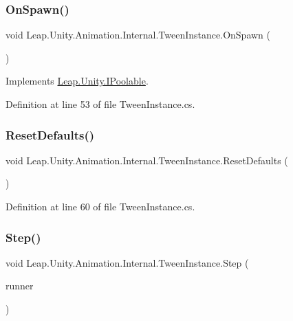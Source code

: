 \subsubsection{\texorpdfstring{OnSpawn()}{OnSpawn()}}
{\footnotesize\ttfamily void Leap.\+Unity.\+Animation.\+Internal.\+Tween\+Instance.\+On\+Spawn (\begin{DoxyParamCaption}{ }\end{DoxyParamCaption})}



Implements \mbox{\hyperlink{interface_leap_1_1_unity_1_1_i_poolable_af2e9cf2345aeddf586f7e86fa8301442}{Leap.\+Unity.\+I\+Poolable}}.



Definition at line 53 of file Tween\+Instance.\+cs.

\mbox{\label{class_leap_1_1_unity_1_1_animation_1_1_internal_1_1_tween_instance_a26f8945be59207c1cc17d309386e1081}} 
\subsubsection{\texorpdfstring{ResetDefaults()}{ResetDefaults()}}
{\footnotesize\ttfamily void Leap.\+Unity.\+Animation.\+Internal.\+Tween\+Instance.\+Reset\+Defaults (\begin{DoxyParamCaption}{ }\end{DoxyParamCaption})}



Definition at line 60 of file Tween\+Instance.\+cs.

\mbox{\label{class_leap_1_1_unity_1_1_animation_1_1_internal_1_1_tween_instance_a97039709d9678b0307e8af16c7416664}} 
\subsubsection{\texorpdfstring{Step()}{Step()}}
{\footnotesize\ttfamily void Leap.\+Unity.\+Animation.\+Internal.\+Tween\+Instance.\+Step (\begin{DoxyParamCaption}\item[{\mbox{\hyperlink{class_leap_1_1_unity_1_1_animation_1_1_internal_1_1_tween_runner}{Tween\+Runner}}}]{runner }\end{DoxyParamCaption})}



